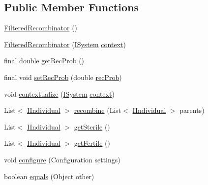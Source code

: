\subsection*{Public Member Functions}
\begin{DoxyCompactItemize}
\item 
\hyperlink{classnet_1_1sf_1_1jclec_1_1base_1_1_filtered_recombinator_a1a41eabc84e39fef2c99cc174a69e9b8}{Filtered\-Recombinator} ()
\item 
\hyperlink{classnet_1_1sf_1_1jclec_1_1base_1_1_filtered_recombinator_a2b4d7b17304238ffc20d71e0f4f1186f}{Filtered\-Recombinator} (\hyperlink{interfacenet_1_1sf_1_1jclec_1_1_i_system}{I\-System} \hyperlink{classnet_1_1sf_1_1jclec_1_1base_1_1_decorated_recombinator_a9fec99558ae7ddcf3ce82d8293305786}{context})
\item 
final double \hyperlink{classnet_1_1sf_1_1jclec_1_1base_1_1_filtered_recombinator_a887d9abe4e5e7fe134bbdc716387cb15}{get\-Rec\-Prob} ()
\item 
final void \hyperlink{classnet_1_1sf_1_1jclec_1_1base_1_1_filtered_recombinator_a21dbfdc8caf8740033e890061677ab76}{set\-Rec\-Prob} (double \hyperlink{classnet_1_1sf_1_1jclec_1_1base_1_1_filtered_recombinator_acadc9204c4432d1bb6ff5e8f4a085267}{rec\-Prob})
\item 
void \hyperlink{classnet_1_1sf_1_1jclec_1_1base_1_1_filtered_recombinator_ab492294f4c41c12c8832051623b225f4}{contextualize} (\hyperlink{interfacenet_1_1sf_1_1jclec_1_1_i_system}{I\-System} \hyperlink{classnet_1_1sf_1_1jclec_1_1base_1_1_decorated_recombinator_a9fec99558ae7ddcf3ce82d8293305786}{context})
\item 
List$<$ \hyperlink{interfacenet_1_1sf_1_1jclec_1_1_i_individual}{I\-Individual} $>$ \hyperlink{classnet_1_1sf_1_1jclec_1_1base_1_1_filtered_recombinator_a5611547b9db9f88087d817c2b896dcec}{recombine} (List$<$ \hyperlink{interfacenet_1_1sf_1_1jclec_1_1_i_individual}{I\-Individual} $>$ parents)
\item 
List$<$ \hyperlink{interfacenet_1_1sf_1_1jclec_1_1_i_individual}{I\-Individual} $>$ \hyperlink{classnet_1_1sf_1_1jclec_1_1base_1_1_filtered_recombinator_a757a0623d59a36acb068ada503edae20}{get\-Sterile} ()
\item 
List$<$ \hyperlink{interfacenet_1_1sf_1_1jclec_1_1_i_individual}{I\-Individual} $>$ \hyperlink{classnet_1_1sf_1_1jclec_1_1base_1_1_filtered_recombinator_a884f05ef201c32db04402b00e9069322}{get\-Fertile} ()
\item 
void \hyperlink{classnet_1_1sf_1_1jclec_1_1base_1_1_filtered_recombinator_abfcf757063e206f5c0ec482be5d9e9c1}{configure} (Configuration settings)
\item 
boolean \hyperlink{classnet_1_1sf_1_1jclec_1_1base_1_1_filtered_recombinator_ab14cc17cac864ee477e29e289601d30f}{equals} (Object other)
\end{DoxyCompactItemize}
